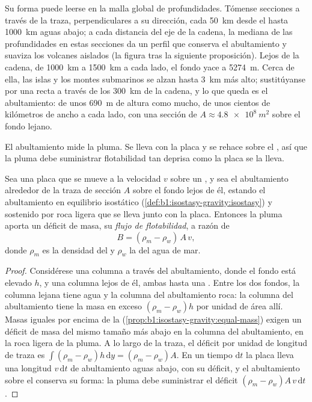 Su forma puede leerse en la malla global de profundidades. Tómense secciones a través de la traza, perpendiculares a su dirección, cada
\qty{50}{km} desde el  hasta \qty{1000}{km} aguas abajo; a cada distancia del eje de la cadena, la mediana de las profundidades en estas
secciones da un perfil que conserva el abultamiento y suaviza los volcanes aislados (la figura tras la siguiente proposición). Lejos de la cadena, de
\qty{1000}{km} a \qty{1500}{km} a cada lado, el fondo yace a \qty{5274}{m}. Cerca de ella, las islas y los montes submarinos se alzan hasta \qty{3}{km} más
alto; sustitúyanse por una recta a través de los \qty{300}{km} de la cadena, y lo que queda es el abultamiento: de unos \qty{690}{m} de altura como mucho,
de unos cientos de kilómetros de ancho a cada lado, con una sección de $A \approx \qty{4.8e8}{m^2}$ sobre el fondo lejano.

El abultamiento mide la pluma. Se lleva con la placa y se rehace sobre el , así que la pluma debe suministrar flotabilidad tan deprisa
como la placa se la lleva.

\begin{proposition}\label{prop:b1:hotspots:buoyancy}
Sea una placa que se mueve a la velocidad $v$ sobre un , y sea el abultamiento alrededor de la traza de sección $A$ sobre el fondo lejos
de él, estando el abultamiento en equilibrio isostático (\cref{def:b1:isostasy-gravity:isostasy}) y sostenido por roca ligera que se lleva junto con la
placa. Entonces la pluma aporta un déficit de masa, su \emph{flujo de flotabilidad}, a razón de
\[
  B = (\rho_m - \rho_w)\,A\,v ,
\]
donde $\rho_m$ es la densidad del  y $\rho_w$ la del agua de mar.
\end{proposition}

\begin{proof}
Considérese una columna a través del abultamiento, donde el fondo está elevado $h$, y una columna lejos de él, ambas hasta una . Entre los dos fondos, la columna lejana tiene agua y la columna del abultamiento roca: la columna del abultamiento tiene la masa en
exceso $(\rho_m - \rho_w)h$ por unidad de área allí. Masas iguales por encima de la 
(\cref{prop:b1:isostasy-gravity:equal-mass}) exigen un déficit de masa del mismo tamaño más abajo en la columna del abultamiento, en la roca ligera de la
pluma. A lo largo de la traza, el déficit por unidad de longitud de traza es $\int(\rho_m - \rho_w)h\,\mathrm dy = (\rho_m - \rho_w)A$. En un tiempo
$\mathrm dt$ la placa lleva una longitud $v\,\mathrm dt$ de abultamiento aguas abajo, con su déficit, y el abultamiento sobre el  conserva
su forma: la pluma debe suministrar el déficit $(\rho_m - \rho_w)A\,v\,\mathrm dt$.
\end{proof}

